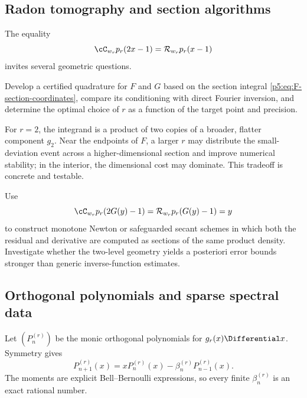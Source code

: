 \documentclass[11pt]{article}
\theoremstyle{definition}
\theoremstyle{remark}
\newcommand{\cR}{\mathcal R}
\begin{document}
\subsection{Radon tomography and section algorithms}

The equality
\begin{equation}
 \cC_{w_r}p_r(2x-1)=\cR_{w_r}p_r(x-1)                      \label{p5:eq:tomography-core}
\end{equation}
invites several geometric questions.

\begin{openproblem}
Develop a certified quadrature for $F$ and $G$ based on the section integral
\eqref{p5:eq:F-section-coordinates}, compare its conditioning with direct Fourier
inversion, and determine the optimal choice of $r$ as a function of the target
point and precision.
\end{openproblem}

For $r=2$, the integrand is a product of two copies of a broader, flatter
component $g_2$.  Near the endpoints of $F$, a larger $r$ may distribute the
small-deviation event across a higher-dimensional section and improve numerical
stability; in the interior, the dimensional cost may dominate.  This tradeoff
is concrete and testable.

\begin{openproblem}
Use
\begin{equation}
 \cC_{w_r}p_r(2G(y)-1)=\cR_{w_r}p_r(G(y)-1)=y              \label{p5:eq:quantile-tomography-problem}
\end{equation}
to construct monotone Newton or safeguarded secant schemes in which both the
residual and derivative are computed as sections of the same product density.
Investigate whether the two-level geometry yields a posteriori error bounds
stronger than generic inverse-function estimates.
\end{openproblem}

\subsection{Orthogonal polynomials and sparse spectral data}

Let $(P_n^{(r)})$ be the monic orthogonal polynomials for $g_r(x)\Differential x$.
Symmetry gives
\begin{equation}
 P_{n+1}^{(r)}(x)=xP_n^{(r)}(x)-\beta_n^{(r)}P_{n-1}^{(r)}(x). \label{p5:eq:sparse-Jacobi}
\end{equation}
The moments are explicit Bell--Bernoulli expressions, so every finite
$\beta_n^{(r)}$ is an exact rational number.
\end{document}
